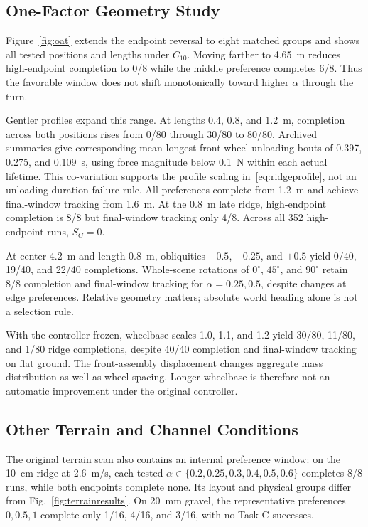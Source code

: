 \documentclass[journal]{IEEEtran}
\begin{document}
\subsection{One-Factor Geometry Study}
Figure~\ref{fig:oat} extends the endpoint reversal to eight matched groups and shows all tested positions and lengths under $C_{10}$. Moving farther to 4.65~m reduces high-endpoint completion to 0/8 while the middle preference completes 6/8. Thus the favorable window does not shift monotonically toward higher $\alpha$ through the turn.



Gentler profiles expand this range. At lengths 0.4, 0.8, and 1.2~m, completion across both positions rises from 0/80 through 30/80 to 80/80. Archived summaries give corresponding mean longest front-wheel unloading bouts of 0.397, 0.275, and 0.109~s, using force magnitude below 0.1~N within each actual lifetime. This co-variation supports the profile scaling in~\eqref{eq:ridgeprofile}, not an unloading-duration failure rule. All preferences complete from 1.2~m and achieve final-window tracking from 1.6~m. At the 0.8~m late ridge, high-endpoint completion is 8/8 but final-window tracking only 4/8. Across all 352 high-endpoint runs, $S_C=0$.

At center 4.2~m and length 0.8~m, obliquities $-0.5$, $+0.25$, and $+0.5$ yield 0/40, 19/40, and 22/40 completions. Whole-scene rotations of $0^\circ$, $45^\circ$, and $90^\circ$ retain 8/8 completion and final-window tracking for $\alpha=0.25,0.5$, despite changes at edge preferences. Relative geometry matters; absolute world heading alone is not a selection rule.

With the controller frozen, wheelbase scales 1.0, 1.1, and 1.2 yield 30/80, 11/80, and 1/80 ridge completions, despite 40/40 completion and final-window tracking on flat ground. The front-assembly displacement changes aggregate mass distribution as well as wheel spacing. Longer wheelbase is therefore not an automatic improvement under the original controller.

\subsection{Other Terrain and Channel Conditions}
The original terrain scan also contains an internal preference window: on the 10~cm ridge at 2.6~m/s, each tested $\alpha\in\{0.2,0.25,0.3,0.4,0.5,0.6\}$ completes 8/8 runs, while both endpoints complete none. Its layout and physical groups differ from Fig.~\ref{fig:terrainresults}. On 20~mm gravel, the representative preferences $0,0.5,1$ complete only 1/16, 4/16, and 3/16, with no Task-C successes.
\end{document}
